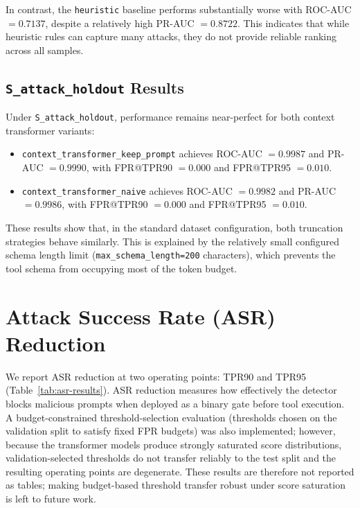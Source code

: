In contrast, the \texttt{heuristic} baseline performs substantially worse with ROC-AUC $=0.7137$, despite a relatively high PR-AUC $=0.8722$. This indicates that while heuristic rules can capture many attacks, they do not provide reliable ranking across all samples.

\subsection{\texttt{S\_attack\_holdout} Results}

Under \texttt{S\_attack\_holdout}, performance remains near-perfect for both context transformer variants:

\begin{itemize}
    \item \texttt{context\_transformer\_keep\_prompt} achieves ROC-AUC $=0.9987$ and PR-AUC $=0.9990$, with FPR@TPR90 $=0.000$ and FPR@TPR95 $=0.010$.
    \item \texttt{context\_transformer\_naive} achieves ROC-AUC $=0.9982$ and PR-AUC $=0.9986$, with FPR@TPR90 $=0.000$ and FPR@TPR95 $=0.010$.
\end{itemize}

These results show that, in the standard dataset configuration, both truncation strategies behave similarly. This is explained by the relatively small configured schema length limit (\texttt{max\_schema\_length=200} characters), which prevents the tool schema from occupying most of the token budget.

\section{Attack Success Rate (ASR) Reduction}
\label{subsec:asr_reduction}

We report ASR reduction at two operating points: TPR90 and TPR95 (Table~\ref{tab:asr-results}). ASR reduction measures how effectively the detector blocks malicious prompts when deployed as a binary gate before tool execution. A budget-constrained threshold-selection evaluation (thresholds chosen on the validation split to satisfy fixed FPR budgets) was also implemented; however, because the transformer models produce strongly saturated score distributions, validation-selected thresholds do not transfer reliably to the test split and the resulting operating points are degenerate. These results are therefore not reported as tables; making budget-based threshold transfer robust under score saturation is left to future work.

